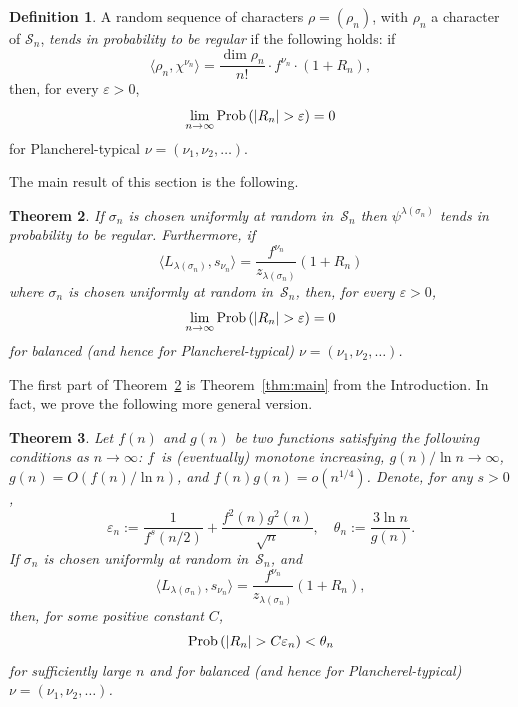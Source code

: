 \documentclass[12pt]%
{amsart}
\renewcommand\S{{\mathcal S}}
\newcommand{\la}{{\lambda}}
\newcommand{\si}{{\sigma}}
\newcommand{\Prob}{{\rm Prob}}
\theoremstyle{plain}
\newtheorem{theorem}{Theorem}[section]
\theoremstyle{definition}
\newtheorem{definition}[theorem]{Definition}
\theoremstyle{remark}
\newcommand{\ve}{\varepsilon}
\newcommand{\todo}[1]{\vspace{5 mm}\par \noindent
	\marginpar{\textsc{ToDo}} \framebox{\begin{minipage}[c]{0.95
				\textwidth}
			#1 \end{minipage}}\vspace{5 mm}\par}
\begin{document}


\begin{definition}\label{def:tends_in_probability}
    A random sequence of characters $\rho = (\rho_n)$, with $\rho_n$ a character of $\S_n$, {\em tends in probability to be regular} if the following holds: 
    if
    \[
        \langle \rho_n,\chi^{\nu_n} \rangle 
        = \frac{\dim \rho_n}{n!} \cdot f^{\nu_n} \cdot (1 + R_n),
    \]
    then, for every $\ve > 0$,
    \[
        \lim_{n \to \infty} \Prob\,(|R_n| > \ve) = 0
    \]
    for Plancherel-typical $\nu=(\nu_1,\nu_2,\ldots)$. 
\end{definition}


The main result of this section is the following.





\begin{theorem}\label{thm:main1}
    If $\si_n$ is chosen uniformly at random in~$\S_n$ then $\psi^{\la(\si_n)}$ tends in probability to be regular. 
    Furthermore, 
    if
    \[
        \langle L_{\la(\si_n)},s_{\nu_n} \rangle 
        = \frac{f^{\nu_n}}{z_{\la(\si_n)}} (1+R_n) 
    \]
    where $\si_n$ is chosen uniformly at random in~$\S_n$, then, for every $\ve >0$,
    \[
        \lim_{n \to \infty} \Prob\,(|R_n| > \ve) = 0
    \]
    for balanced (and hence for Plancherel-typical) $\nu=(\nu_1,\nu_2,\ldots)$. 
\end{theorem}

The first part of Theorem~\ref{thm:main1} is Theorem~\ref{thm:main} from the Introduction.
In fact, we prove the following more general version.

\begin{theorem}\label{thm:main_general}
    Let $f(n)$ and $g(n)$ be two functions satisfying the following conditions as $n\to\infty$:
    $f$~is (eventually) monotone increasing, %
    $g(n) / \ln n\to\infty$, $g(n) = O(f(n) / \ln n)$, %
    and $f(n)g(n)=o(n^{1/4})$. Denote, for any $s>0$,
    \[
        \ve_n := \frac1{f^s(n/2)} + \frac{f^2(n)g^2(n)}{\sqrt n},
        \quad 
        \theta_n
        := \frac{3 \ln n}{g(n)}.
    \]
    If $\si_n$ is chosen uniformly at random in~$\S_n$, and
    \[
        \langle L_{\la(\si_n)},s_{\nu_n} \rangle 
        = \frac{f^{\nu_n}}{z_{\la(\si_n)}} (1+R_n), 
    \]
    then, for some positive constant $C$, 
    \[
        \Prob\,(|R_n| > C \ve_n) <\theta_n
    \]
    for sufficiently large $n$ and for balanced (and hence for Plancherel-typical) $\nu=(\nu_1,\nu_2,\ldots)$. 
\end{theorem}
\end{document}
